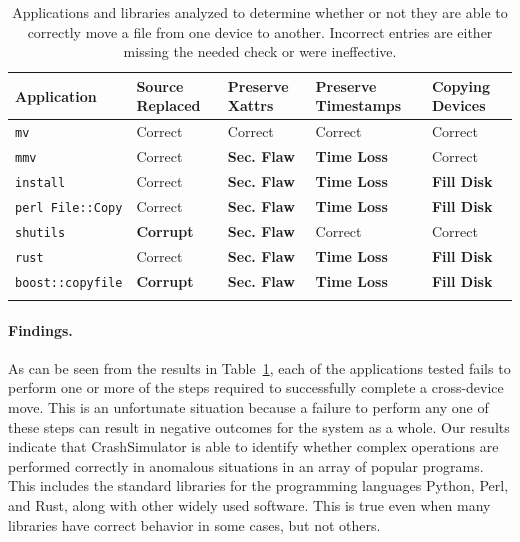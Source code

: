  \begin{table}[t]
    \scriptsize{}
    \begin{tabular}{l p{1cm} p{1cm} p{1.2cm} p{1cm}}
    \toprule{}
        Application     & Source Replaced & Preserve Xattrs & Preserve Timestamps & Copying Devices\\
\hline
        {\tt mv}              & Correct             & Correct         & Correct             & Correct\\
        {\tt mmv}             & Correct             & {\bf Sec. Flaw} & {\bf Time Loss} & Correct\\
        {\tt install}         & Correct             & {\bf Sec. Flaw} & {\bf Time Loss} & {\bf Fill Disk} \\
        {\tt perl File::Copy} & Correct             & {\bf Sec. Flaw} & {\bf Time Loss} & {\bf Fill Disk} \\
        {\tt shutils}         & {\bf Corrupt}	& {\bf Sec. Flaw} 	& Correct             & Correct\\
        {\tt rust}             & Correct             & {\bf Sec. Flaw} & {\bf Time Loss} & {\bf Fill Disk} \\
        {\tt boost::copyfile} & {\bf Corrupt}	      & {\bf Sec. Flaw} & {\bf Time Loss} & {\bf Fill Disk} \\
    \bottomrule{}
    \end{tabular}
    \caption{Applications and libraries analyzed to determine whether or not
      they are able to correctly move a file from one device to another.
Incorrect entries are either missing the needed check or were ineffective.}
    \label{table:crossdevice}
\end{table}

\paragraph{Findings.}
As can be seen from the results in Table~\ref{table:crossdevice}, each of the
applications tested fails to perform one or more of the steps required to
successfully complete a cross-device move.  This is an unfortunate situation
because a failure to perform any one of these steps can result in negative
outcomes for the system as a whole.
Our results indicate that CrashSimulator is able to identify whether complex
operations are performed correctly in anomalous situations in
an array of popular programs.
This includes the standard libraries for the programming languages Python,
Perl, and Rust, along with other widely used software.  This is true even
when many libraries have correct behavior in some cases, but not others.


